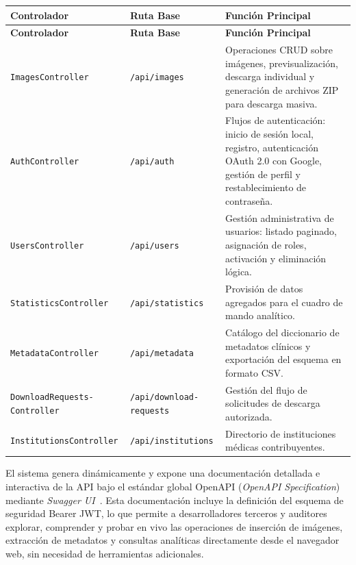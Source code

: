 \begin{longtable}{|p{4.7cm}|p{3.5cm}|p{7.5cm}|}
\hline
\textbf{Controlador} & \textbf{Ruta Base} & \textbf{Función Principal} \\
\hline
\endfirsthead
\hline
\textbf{Controlador} & \textbf{Ruta Base} & \textbf{Función Principal} \\
\hline
\endhead
\texttt{ImagesController} & \texttt{/api/images} & Operaciones CRUD sobre imágenes, previsualización, 
descarga individual y generación de archivos ZIP para descarga masiva. \\
\hline
\texttt{AuthController} & \texttt{/api/auth} & Flujos de autenticación: inicio de sesión local, registro, 
autenticación OAuth 2.0 con Google, gestión de perfil y restablecimiento de contraseña. \\
\hline
\texttt{UsersController} & \texttt{/api/users} & Gestión administrativa de usuarios: listado paginado, 
asignación de roles, activación y eliminación lógica. \\
\hline
\texttt{StatisticsController} & \texttt{/api/statistics} & Provisión de datos agregados para el cuadro 
de mando analítico. \\
\hline
\texttt{MetadataController} & \texttt{/api/metadata} & Catálogo del diccionario de metadatos clínicos y 
exportación del esquema en formato CSV. \\
\hline
\texttt{DownloadRequests-Controller} & \texttt{/api/download-requests} & Gestión del flujo de solicitudes 
de descarga autorizada. \\
\hline
\texttt{InstitutionsController} & \texttt{/api/institutions} & Directorio de instituciones médicas 
contribuyentes. \\
\hline
\end{longtable}

El sistema genera dinámicamente y expone una documentación detallada e interactiva de la API bajo el estándar 
global OpenAPI (\textit{OpenAPI Specification})~\cite{openapi_spec} mediante 
\textit{Swagger UI}~\cite{swagger_docs}. Esta documentación incluye la definición del esquema de seguridad 
Bearer JWT, lo que permite a desarrolladores terceros y auditores explorar, comprender y probar en vivo las 
operaciones de inserción de imágenes, extracción de metadatos y consultas analíticas directamente desde el 
navegador web, sin necesidad de herramientas adicionales.


